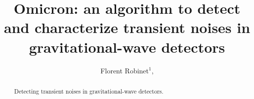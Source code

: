 \documentclass[aps]{revtex4-1}
\begin{document}

\title{Omicron: an algorithm to detect and characterize transient noises in gravitational-wave detectors}

\begin{abstract}
  Detecting transient noises in gravitational-wave detectors.
\end{abstract}

\author{
  Florent Robinet$^1$,  
}
        
\address{$^1$LAL, Univ Paris-Sud, CNRS/IN2P3, Orsay, France}

\maketitle







\end{document}
